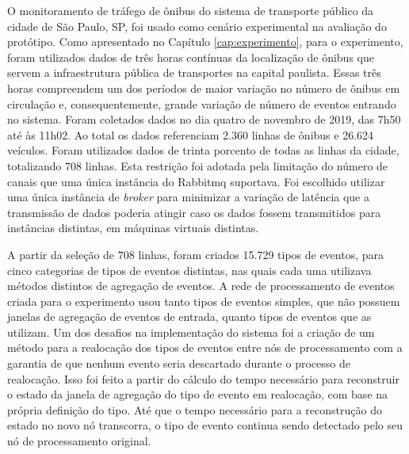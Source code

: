 O monitoramento de tráfego de ônibus do sistema de transporte
público da cidade de São Paulo, SP, foi usado como cenário experimental na avaliação do protótipo. Como apresentado no Capítulo \ref{cap:experimento}, para o experimento, foram utilizados dados de três horas contínuas da localização de ônibus que servem a infraestrutura pública de transportes na capital paulista. Essas três horas compreendem um dos períodos de maior variação no número de ônibus em circulação e, consequentemente, grande variação de número de eventos entrando no sistema. Foram coletados dados no dia quatro de novembro de 2019, das 7h50 até às 11h02. Ao total os dados referenciam 2.360 linhas de ônibus e 26.624 veículos. Foram utilizados dados de trinta porcento de todas as linhas da cidade, totalizando 708 linhas. Esta restrição foi adotada pela limitação do número de canais que uma única instância do Rabbitmq suportava. Foi escolhido utilizar uma única instância de \textit{broker} para minimizar a variação de latência que a transmissão de dados poderia atingir caso os dados fossem transmitidos para instâncias distintas, em máquinas virtuais distintas. 

A partir da seleção de 708 linhas, foram criados 15.729 tipos de eventos, para cinco categorias de tipos de eventos distintas, nas quais cada uma utilizava métodos distintos de agregação de eventos. A rede de processamento de eventos criada para o experimento usou tanto tipos de eventos simples, que não possuem janelas de agregação de eventos de entrada, quanto tipos de eventos que as utilizam. Um dos desafios na implementação do sistema foi a criação de um método para a realocação dos tipos de eventos entre nós de processamento com a garantia de que nenhum evento seria descartado durante o processo de realocação. Isso foi feito a partir do cálculo do tempo necessário para reconstruir o estado da janela de agregação do tipo de evento em realocação, com base na própria definição do tipo. Até que o tempo necessário para a reconstrução do estado no novo nó transcorra, o tipo de evento continua sendo detectado pelo seu nó de processamento original.

